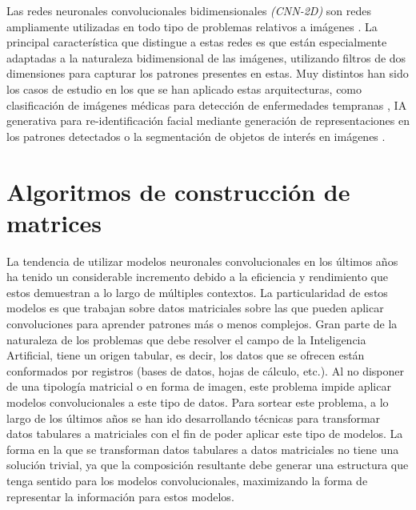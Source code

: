 \documentclass{uathesis-es}
\begin{document}
	Las redes neuronales convolucionales bidimensionales \textit{(CNN-2D)} son redes ampliamente utilizadas en todo tipo de problemas relativos a imágenes \cite{9451544}. La principal característica que distingue a estas redes es que están especialmente adaptadas a la naturaleza bidimensional de las imágenes, utilizando filtros de dos dimensiones para capturar los patrones presentes en estas. Muy distintos han sido los casos de estudio en los que se han aplicado estas arquitecturas, como clasificación de imágenes médicas para detección de enfermedades tempranas \cite{7064414}, IA generativa para re-identificación facial \cite{6909616} mediante generación de representaciones en los patrones detectados o la segmentación de objetos de interés en imágenes \cite{long2015fully}.
	
	\section{Algoritmos de construcción de matrices}
	\label{SOAT_MATRIX_ALGORITHM_CONSTRUCTION}
	
	La tendencia de utilizar modelos neuronales convolucionales en los últimos años ha tenido un considerable incremento debido a la eficiencia y rendimiento que estos demuestran a lo largo de múltiples contextos. La particularidad de estos modelos es que trabajan sobre datos matriciales sobre las que pueden aplicar convoluciones para aprender patrones más o menos complejos. Gran parte de la naturaleza de los problemas que debe resolver el campo de la Inteligencia Artificial, tiene un origen tabular, es decir, los datos que se ofrecen están conformados por registros (bases de datos, hojas de cálculo, etc.). Al no disponer de una tipología matricial o en forma de imagen, este problema impide aplicar modelos convolucionales a este tipo de datos. Para sortear este problema, a lo largo de los últimos años se han ido desarrollando técnicas para transformar datos tabulares a matriciales con el fin de poder aplicar este tipo de modelos. La forma en la que se transforman datos tabulares a datos matriciales no tiene una solución trivial, ya que la composición resultante debe generar una estructura que tenga sentido para los modelos convolucionales, maximizando la forma de representar la información para estos modelos. 
	
\end{document}
